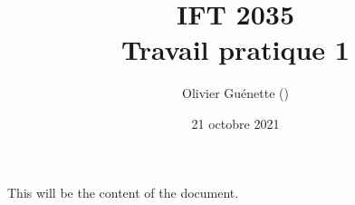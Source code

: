 \documentclass[12pt, letterpaper]{article}
\title{IFT 2035 \\ Travail pratique 1}
\author{Olivier Guénette () }
\date{21 octobre 2021}
\begin{document}
\maketitle
This will be the content of the document.
\end{document}
